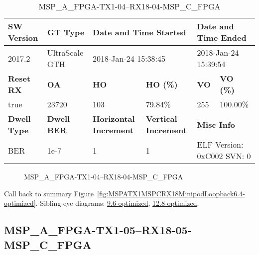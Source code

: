 \begin{table}[h]
\centering
\caption{MSP\_A\_FPGA-TX1-04--RX18-04-MSP\_C\_FPGA}
\label{tab:MSPAFPGATX104RX1804MSPCFPGA6.4-optimized}
\begin{tabular}{@{}|l|l|l|l|l|l|@{}}
\toprule
\textbf{SW Version}                & \textbf{GT Type}   & \multicolumn{2}{l|}{\textbf{Date and Time Started}}            & \multicolumn{2}{l|}{\textbf{Date and Time Ended}}        \\ \midrule
2017.2                       & UltraScale GTH          & \multicolumn{2}{l|}{2018-Jan-24 15:38:45}                   & \multicolumn{2}{l|}{2018-Jan-24 15:39:54}               \\ \midrule
\textbf{Reset RX}                  & \textbf{OA} & \textbf{HO}   & \textbf{HO (\%)} & \textbf{VO} & \textbf{VO (\%)} \\ \midrule
true & 23720        & 103          & 79.84\%        & 255        & 100.00\%       \\ \midrule
\textbf{Dwell Type}                & \textbf{Dwell BER} & \textbf{Horizontal Increment} & \textbf{Vertical Increment}    & \multicolumn{2}{l|}{\textbf{Misc Info}}                  \\ \midrule
BER                            & 1e-7        & 1        & 1           & \multicolumn{2}{l|}{ELF Version: 0xC002 SVN: 0}                         \\ \bottomrule
\end{tabular}
\end{table}

\begin{figure}[h]
\caption{MSP\_A\_FPGA-TX1-04--RX18-04-MSP\_C\_FPGA} \label{fig:MSPAFPGATX104RX1804MSPCFPGA6.4-optimized}
\end{figure}

Call back to summary Figure~\ref{fig:MSPATX1MSPCRX18MinipodLoopback6.4-optimized}.
Sibling eye diagrams: \hyperref[sec:MSPAFPGATX104RX1804MSPCFPGA9.6-optimized]{9.6-optimized}, \hyperref[sec:MSPAFPGATX104RX1804MSPCFPGA12.8-optimized]{12.8-optimized}.

\clearpage
\newpage


\subsection{MSP\_A\_FPGA-TX1-05--RX18-05-MSP\_C\_FPGA}\label{sec:MSPAFPGATX105RX1805MSPCFPGA6.4-optimized}

